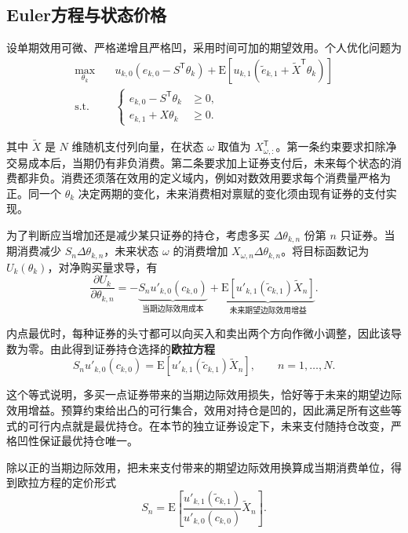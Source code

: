 \subsection{Euler方程与状态价格}
设单期效用可微、严格递增且严格凹，采用时间可加的期望效用。个人优化问题为
\[
 \begin{aligned}
 \max_{\theta_k}\quad &u_{k,0}(e_{k,0}-S^{\mathsf T}\theta_k)
 +\mathrm E[u_{k,1}(\widetilde e_{k,1}+\widetilde X^{\mathsf T}\theta_k)]\\
 \text{s.t.}\quad &
 \left\{\begin{aligned}
 e_{k,0}-S^{\mathsf T}\theta_k&\ge0,\\
 e_{k,1}+X\theta_k&\ge0.
 \end{aligned}\right.
 \end{aligned}
\]

其中 $\widetilde X$ 是 $N$ 维随机支付列向量，在状态 $\omega$ 取值为 $X_{\omega,:}^{\mathsf T}$。第一条约束要求扣除净交易成本后，当期仍有非负消费。第二条要求加上证券支付后，未来每个状态的消费都非负。消费还须落在效用的定义域内，例如对数效用要求每个消费量严格为正。同一个 $\theta_k$ 决定两期的变化，未来消费相对禀赋的变化须由现有证券的支付实现。

为了判断应当增加还是减少某只证券的持仓，考虑多买 $\Delta\theta_{k,n}$ 份第 $n$ 只证券。当期消费减少 $S_n\Delta\theta_{k,n}$，未来状态 $\omega$ 的消费增加 $X_{\omega,n}\Delta\theta_{k,n}$。将目标函数记为 $U_k(\theta_k)$，对净购买量求导，有
\[
 \frac{\partial U_k}{\partial\theta_{k,n}}
 =-\underbrace{S_nu'_{k,0}(c_{k,0})}_{\text{当期边际效用成本}}
  +\underbrace{\mathrm E[u'_{k,1}(\widetilde c_{k,1})\widetilde X_n]}
               _{\text{未来期望边际效用增益}}.
\]

内点最优时，每种证券的头寸都可以向买入和卖出两个方向作微小调整，因此该导数为零。由此得到证券持仓选择的\textbf{欧拉方程}
\begin{equation}
 S_nu'_{k,0}(c_{k,0})
 =\mathrm E[u'_{k,1}(\widetilde c_{k,1})\widetilde X_n],\qquad n=1,\ldots,N.
 \label{eq:wj-11-1}
\end{equation}

这个等式说明，多买一点证券带来的当期边际效用损失，恰好等于未来的期望边际效用增益。预算约束给出凸的可行集合，效用对持仓是凹的，因此满足所有这些等式的可行内点就是最优持仓。在本节的独立证券设定下，未来支付随持仓改变，严格凹性保证最优持仓唯一。

除以正的当期边际效用，把未来支付带来的期望边际效用换算成当期消费单位，得到欧拉方程的定价形式
\begin{equation}
 S_n=\mathrm E\left[
 \frac{u'_{k,1}(\widetilde c_{k,1})}{u'_{k,0}(c_{k,0})}\widetilde X_n
 \right].
 \label{eq:wj-11-2}
\end{equation}

